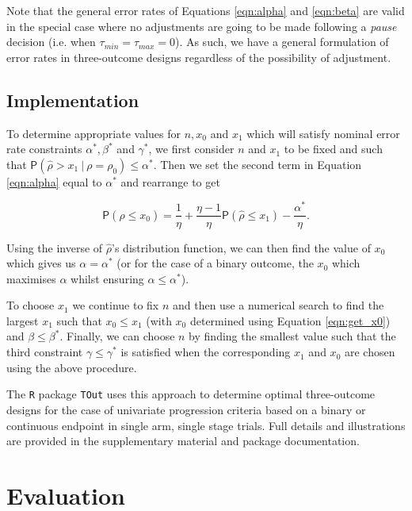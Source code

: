 \documentclass{bmcart}
\newcommand{\PR}{{\mathsf P}}
\begin{document}
Note that the general error rates of Equations \ref{eqn:alpha} and \ref{eqn:beta} are valid in the special case where no adjustments are going to be made following a \emph{pause} decision (i.e. when $\tau_{min} = \tau_{max} = 0$). As such, we have a general formulation of error rates in three-outcome designs regardless of the possibility of adjustment. 

\subsection{Implementation}

To determine appropriate values for $n, x_0$ and $x_1$ which will satisfy nominal error rate constraints $\alpha^*, \beta^*$ and $\gamma^*$, we first consider $n$ and $x_1$ to be fixed and such that $\PR(\hat{\rho} > x_1 ~|~ \rho = \rho_0) \leq \alpha^*$. Then we set the second term in Equation \ref{eqn:alpha} equal to $\alpha^*$ and rearrange to get

\begin{equation}\label{eqn:get_x0}
\PR(\hat{\rho} \leq x_0) = \frac{1}{\eta} + \frac{\eta - 1}{\eta}\PR(\hat{\rho} \leq x_1) - \frac{\alpha^*}{\eta}.
\end{equation}

Using the inverse of $\hat{\rho}$'s distribution function, we can then find the value of $x_0$ which gives us $\alpha = \alpha^*$ (or for the case of a binary outcome, the $x_0$ which maximises $\alpha$ whilst ensuring $\alpha \leq \alpha^*$).

To choose $x_1$ we continue to fix $n$ and then use a numerical search to find the largest $x_1$ such that $x_0 \leq x_1$ (with $x_0$ determined using Equation \ref{eqn:get_x0}) and $\beta \leq \beta^*$. Finally, we can choose $n$ by finding the smallest value such that the third constraint $\gamma \leq \gamma^*$ is satisfied when the corresponding $x_1$ and $x_0$ are chosen using the above procedure.

The \texttt{R} package \texttt{TOut} uses this approach to determine optimal three-outcome designs for the case of univariate progression criteria based on a binary or continuous endpoint in single arm, single stage trials. Full details and illustrations are provided in the supplementary material and package documentation.

\section{Evaluation}\label{sec:evaluation}
\end{document}
